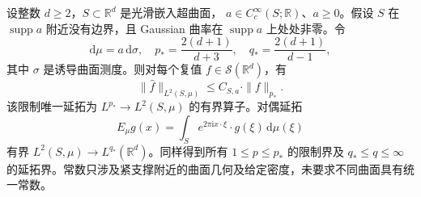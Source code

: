\begin{theorem}\label{b2:thm:23-curved-tomas}
设整数 \(d\geq2\)，\(S\subset\mathbb R^d\) 是光滑嵌入超曲面，
\(a\in C_c^\infty(S;\mathbb R)\)、\(a\geq0\)。假设 \(S\) 在
\(\operatorname{supp}a\) 附近没有边界，且 Gaussian 曲率在
\(\operatorname{supp}a\) 上处处非零。令
\[
 \mathrm d\mu=a\,\mathrm d\sigma,\quad
 p_*=\frac{2(d+1)}{d+3},\quad q_*=\frac{2(d+1)}{d-1},
\]
其中 \(\sigma\) 是诱导曲面测度。则对每个复值 \(f\in\mathcal S(\mathbb R^d)\)，有
\[
 \|\widehat f\|_{L^2(S,\mu)}
 \leq C_{S,a}\cdot\|f\|_{p_*}.
\]
该限制唯一延拓为 \(L^{p_*}\to L^2(S,\mu)\) 的有界算子。对偶延拓
\[
 E_\mu g(x)=\int_Se^{2\pi\mathrm i x\cdot\xi}
 \cdot g(\xi)\,\mathrm d\mu(\xi)
\]
有界 \(L^2(S,\mu)\to L^{q_*}(\mathbb R^d)\)。同样得到所有
\(1\leq p\leq p_*\) 的限制界及 \(q_*\leq q\leq\infty\) 的延拓界。常数只涉及紧支撑附近的曲面几何及给定密度，未要求不同曲面具有统一常数。
\end{theorem}
